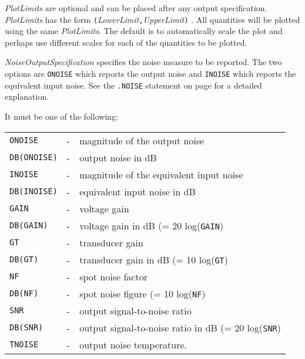 \begin{widelist}
\item[{\it PlotLimits}] are optional and can be placed after any output
     specification. {\it PlotLimits} has the form
     {\tt (}{\it LowerLimit}{\tt ,}{\it UpperLimit}{\tt )} .
     All quantities will be plotted using the same
     {\it PlotLimits}.  The default is to automatically scale the plot and
     perhaps use different scales for each of the quantities to be plotted.
      
\end{widelist}

\begin{widelist}
\item[{\it NoiseOutputSpecification}]
     specifies the noise measure to be reported. The two options are
     {\tt ONOISE} which reports the output noise and
     {\tt INOISE} which reports the equivalent input noise.
     See the {\tt .NOISE} statement on page \pageref{.NOISEstatement}
     for a detailed explanation.

     It  must be one of the following:\\
      \offset\begin{tabular}{lcp{3.5in}}
      {\tt ONOISE} &-&magnitude of the output noise\\
      {\tt DB(ONOISE)} &-&output noise in dB\\
      {\tt INOISE} &-&magnitude of the equivalent input noise\\
      {\tt DB(INOISE)} &-&equivalent input noise in dB\\
      {\tt GAIN} &-&voltage gain\\
      {\tt DB(GAIN)} &-&voltage gain in dB (= 20 log({\tt GAIN})\\
      {\tt GT} &-&transducer gain\\
      {\tt DB(GT)} &-&transducer gain in dB (= 10 log({\tt GT})\\
      {\tt NF} &-&spot noise factor\\
      {\tt DB(NF)} &-& spot noise figure (= 10 log({\tt NF})\\
      {\tt SNR} &-&output signal-to-noise ratio\\
      {\tt DB(SNR)} &-&output signal-to-noise ratio in dB (= 20 log({\tt SNR})\\
      {\tt TNOISE} &-&output noise temperature.
      \end{tabular}


\end{widelist}
